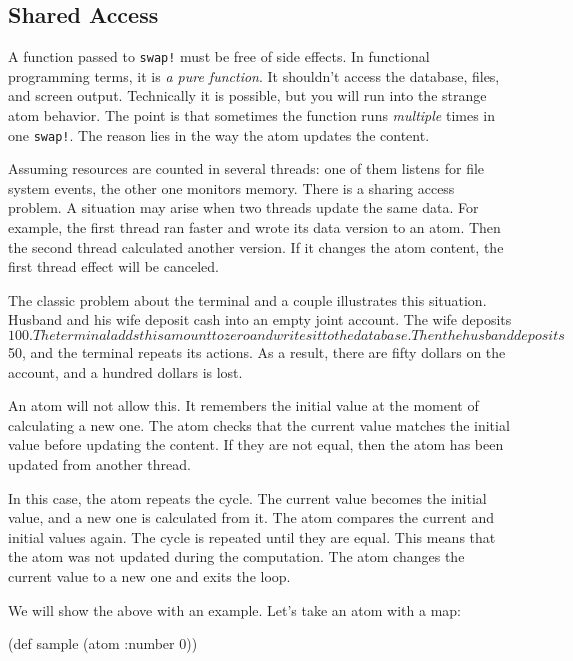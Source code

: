 \subsection{Shared Access}


A function passed to \verb|swap!| must be free of side effects. In functional programming terms, it is \emph{a pure function}.
It shouldn't access the database, files, and screen output.
Technically it is possible, but you will run into the strange atom behavior.
The point is that sometimes the function runs \emph{multiple} times in one \verb|swap!|.
The reason lies in the way the atom updates the content.

Assuming resources are counted in several threads: one of them listens for file system events, the other one monitors memory.
There is a sharing access problem.
A situation may arise when two threads update the same data.
For example, the first thread ran faster and wrote its data version to an atom.
Then the second thread calculated another version.
If it changes the atom content, the first thread effect will be canceled.


The classic problem about the terminal and a couple illustrates this situation. Husband and his wife deposit cash into an empty joint account. The wife deposits $ 100. The terminal adds this amount to zero and writes it to the database. Then the husband deposits $ 50, and the terminal repeats its actions. As a result, there are fifty dollars on the account, and a hundred dollars is lost.

An atom will not allow this.
It remembers the initial value at the moment of calculating a new one.
The atom checks that the current value matches the initial value before updating the content.
If they are not equal, then the atom has been updated from another thread.

In this case, the atom repeats the cycle. The current value becomes the initial value, and a new one is calculated from it. The atom compares the current and initial values again.
The cycle is repeated until they are equal.
This means that the atom was not updated during the computation.
The atom changes the current value to a new one and exits the loop.

We will show the above with an example.
Let's take an atom with a map:

\begin{clojure}
(def sample (atom {:number 0}))
\end{clojure}

